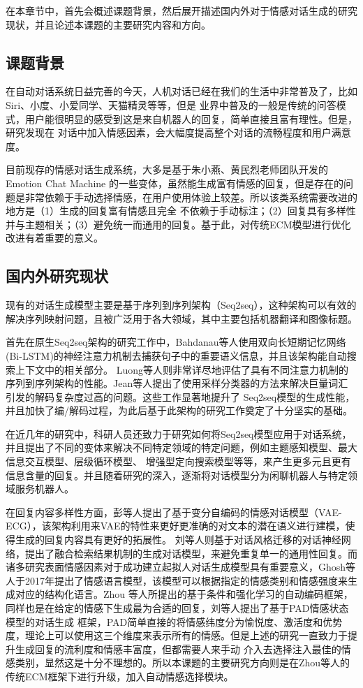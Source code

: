 \documentclass[supercite]{HustGraduPaper}
\theoremstyle{definition}
\begin{document}
在本章节中，首先会概述课题背景，然后展开描述国内外对于情感对话生成的研究现状，并且论述本课题的主要研究内容和方向。

\subsection{课题背景}
在自动对话系统日益完善的今天，人机对话已经在我们的生活中非常普及了，比如Siri、小度、小爱同学、天猫精灵等等，但是
业界中普及的一般是传统的问答模式，用户能很明显的感受到这是来自机器人的回复，简单直接且富有理性。但是，研究发现在
对话中加入情感因素，会大幅度提高整个对话的流畅程度和用户满意度。

目前现存的情感对话生成系统，大多是基于朱小燕、黄民烈老师团队开发的Emotion Chat Machine\cite{DBLP:journals/corr/ZhouHZZL17}
的一些变体，虽然能生成富有情感的回复，但是存在的问题是非常依赖于手动选择情感，在用户使用体验上较差。所以该类系统需要改进的地方是（1）生成的回复富有情感且完全
不依赖于手动标注；（2）回复具有多样性并与主题相关；（3）避免统一而通用的回复。基于此，对传统ECM模型进行优化改进有着重要的意义。

\subsection{国内外研究现状}

现有的对话生成模型主要是基于序列到序列架构（Seq2seq），这种架构可以有效的解决序列映射问题，且被广泛用于各大领域，其中主要包括机器翻译和图像标题。

首先在原生Seq2seq架构的研究工作中，Bahdanau等人使用双向长短期记忆网络(Bi-LSTM)的神经注意力机制去捕获句子中的重要语义信息，并且该架构能自动搜索上下文中的相关部分。
Luong等人则非常详尽地评估了具有不同注意力机制的序列到序列架构的性能。Jean等人提出了使用采样分类器的方法来解决巨量词汇引发的解码复杂度过高的问题。这些工作显著地提升了
Seq2seq模型的生成性能，并且加快了编/解码过程，为此后基于此架构的研究工作奠定了十分坚实的基础。

在近几年的研究中，科研人员还致力于研究如何将Seq2seq模型应用于对话系统，并且提出了不同的变体来解决不同特定领域的特定问题，例如主题感知模型、最大信息交互模型、层级循环模型、
增强型定向搜索模型等等，来产生更多元且更有信息含量的回复。并且随着研究的深入，逐渐将对话模型分为闲聊机器人与特定领域服务机器人。

在回复内容多样性方面，彭等人提出了基于变分自编码的情感对话模型（VAE-ECG），该架构利用来VAE的特性来更好更准确的对文本的潜在语义进行建模，使得生成的回复内容具有更好的拓展性。
刘等人则基于对话风格迁移的对话神经网络，提出了融合检索结果机制的生成对话模型，来避免重复单一的通用性回复。而诸多研究表面情感因素对于成功建立起拟人对话生成模型具有重要意义，Ghosh等人于2017年提出了情感语言模型，该模型可以根据指定的情感类别和情感强度来生成对应的结构化语言。Zhou
等人\cite{DBLP:journals/corr/ZhouHZZL17}所提出的基于条件和强化学习的自动编码框架，同样也是在给定的情感下生成最为合适的回复，刘等人提出了基于PAD情感状态模型的对话生成
框架，PAD简单直接的将情感纬度分为愉悦度、激活度和优势度，理论上可以使用这三个维度来表示所有的情感。但是上述的研究一直致力于提升生成回复的流利度和情感丰富度，但都需要人来手动
介入去选择注入最佳的情感类别，显然这是十分不理想的。所以本课题的主要研究方向则是在Zhou\cite{DBLP:journals/corr/ZhouHZZL17}等人的传统ECM框架下进行升级，加入自动情感选择模块。
\end{document}
